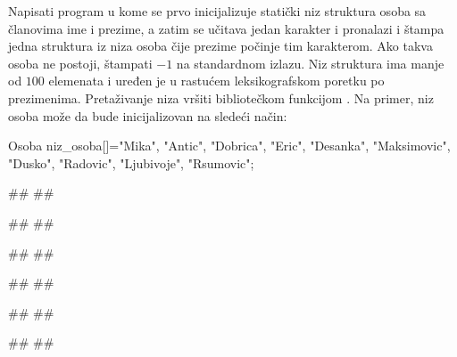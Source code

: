 \begin{Exercise}[label=411]
  Napisati program u kome se prvo inicijalizuje statički niz struktura
  osoba sa članovima ime i prezime, a zatim se učitava jedan
  karakter i pronalazi i štampa jedna struktura iz niza osoba čije prezime počinje tim
  karakterom. Ako takva osoba ne postoji, štampati $-1$ na standardnom
  izlazu.
  Niz struktura ima manje od $100$ elemenata i uređen je u rastućem leksikografskom poretku po prezimenima.
  Pretaživanje niza vršiti bibliotečkom funkcijom .
Na primer, niz osoba može da bude inicijalizovan na sledeći način:
\begin{ckod}
Osoba niz_osoba[]={{"Mika", "Antic"},
                   {"Dobrica", "Eric"},
                   {"Desanka", "Maksimovic"},
                   {"Dusko", "Radovic"},
                   {"Ljubivoje", "Rsumovic"}};
\end{ckod}
  
  
\begin{minitest}
\begin{test}{1}
#\naslovUlaz#
##
  
#\naslovIzlaz#
##
\end{test}
\end{minitest}
\begin{minitest}
\begin{test}{2}
#\naslovUlaz#
##
  
#\naslovIzlaz#
##
\end{test}
\end{minitest}
\begin{minitest}
\begin{test}{3}
#\naslovUlaz#
##
  
#\naslovIzlaz#
##
\end{test}
\end{minitest}


\end{Exercise}




